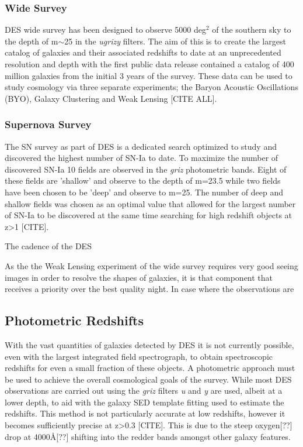 \subsubsection{Wide Survey}
DES wide survey has been designed to observe 5000 deg$^2$ of the southern sky to the depth of m$\sim$25 in the \textit{ugrizy} filters. The aim of this is to create the largest catalog of galaxies and their associated redshifts to date at an unprecedented resolution and depth with the first public data release contained a catalog of 400 million galaxies from the initial 3 years of the survey. These data can be used to study cosmology via three separate experiments; the Baryon Acoustic Oscillations (BYO), Galaxy Clustering and Weak Lensing [CITE ALL].

\subsubsection{Supernova Survey}
The SN survey as part of DES is a dedicated search optimized to study and discovered the highest number of SN-Ia to date. To maximize the number of discovered SN-Ia 10 fields are observed in the \textit{griz} photometric bands. Eight of these fields are 'shallow' and observe to the depth of m=23.5 while two fields have been chosen to be 'deep' and observe to m=25. The number of deep and shallow fields was chosen as an optimal value that allowed for the largest number of SN-Ia to be discovered at the same time searching for high redshift objects at z>1 [CITE].

The cadence of the DES

As the the Weak Lensing experiment of the wide survey requires very good seeing images in order to resolve the shapes of galaxies, it is that component that receives a priority over the best quality night. In case where the observations are

\subsection{Photometric Redshifts}
With the vast quantities of galaxies detected by DES it is not currently possible, even with the largest integrated field spectrograph, to obtain spectroscopic redshifts for even a small fraction of these objects. A photometric approach must be used to achieve the overall cosmological goals of the survey. While most DES observations are carried out using the \textit{griz} filters \textit{u} and \textit{y} are used, albeit at a lower depth, to aid with the galaxy SED template fitting used to estimate the redshifts. This method is not particularly accurate at low redshifts, however it becomes sufficiently precise at z>0.3 [CITE]. This is due to the steep oxygen[??] drop at 4000\AA [??] shifting into the redder bands amongst other galaxy features.


